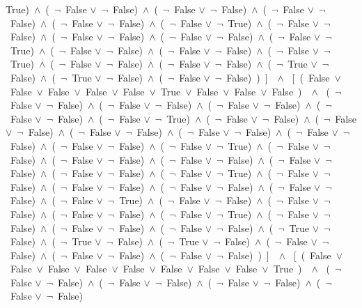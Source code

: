 ﻿\documentclass[a4paper,10pt]{article}
\begin{document}
True)\ $\wedge$\ (\  $\neg$\ False $\vee$\  $\neg$\ False)\ $\wedge$\ (\  $\neg$\ False $\vee$\  $\neg$\ False)\ $\wedge$\ (\  $\neg$\ False $\vee$\  $\neg$\ False)\ $\wedge$\ (\  $\neg$\ False $\vee$\  $\neg$\ False)\ $\wedge$\ (\  $\neg$\ False $\vee$\  $\neg$\ True)\ $\wedge$\ (\  $\neg$\ False $\vee$\  $\neg$\ False)\ $\wedge$\ (\  $\neg$\ False $\vee$\  $\neg$\ False)\ $\wedge$\ (\  $\neg$\ False $\vee$\  $\neg$\ False)\ $\wedge$\ (\  $\neg$\ False $\vee$\  $\neg$\ True)\ $\wedge$\ (\  $\neg$\ False $\vee$\  $\neg$\ False)\ $\wedge$\ (\  $\neg$\ False $\vee$\  $\neg$\ False)\ $\wedge$\ (\  $\neg$\ False $\vee$\  $\neg$\ True)\ $\wedge$\ (\  $\neg$\ False $\vee$\  $\neg$\ False)\ $\wedge$\ (\  $\neg$\ False $\vee$\  $\neg$\ False)\ $\wedge$\ (\  $\neg$\ True $\vee$\  $\neg$\ False)\ $\wedge$\ (\  $\neg$\ True $\vee$\  $\neg$\ False)\ $\wedge$\ (\  $\neg$\ False $\vee$\  $\neg$\ False)\ )\ ]\ \ $\wedge$ \ [\ (\ False\ $\vee$\ False\ $\vee$\ False\ $\vee$\ False\ $\vee$\ False\ $\vee$\ True\ $\vee$\ False\ $\vee$\ False\ $\vee$\ False\ )\ \ $\wedge$ \ (\  $\neg$\ False $\vee$\  $\neg$\ False)\ $\wedge$\ (\  $\neg$\ False $\vee$\  $\neg$\ False)\ $\wedge$\ (\  $\neg$\ False $\vee$\  $\neg$\ False)\ $\wedge$\ (\  $\neg$\ False $\vee$\  $\neg$\ False)\ $\wedge$\ (\  $\neg$\ False $\vee$\  $\neg$\ True)\ $\wedge$\ (\  $\neg$\ False $\vee$\  $\neg$\ False)\ $\wedge$\ (\  $\neg$\ False $\vee$\  $\neg$\ False)\ $\wedge$\ (\  $\neg$\ False $\vee$\  $\neg$\ False)\ $\wedge$\ (\  $\neg$\ False $\vee$\  $\neg$\ False)\ $\wedge$\ (\  $\neg$\ False $\vee$\  $\neg$\ False)\ $\wedge$\ (\  $\neg$\ False $\vee$\  $\neg$\ False)\ $\wedge$\ (\  $\neg$\ False $\vee$\  $\neg$\ True)\ $\wedge$\ (\  $\neg$\ False $\vee$\  $\neg$\ False)\ $\wedge$\ (\  $\neg$\ False $\vee$\  $\neg$\ False)\ $\wedge$\ (\  $\neg$\ False $\vee$\  $\neg$\ False)\ $\wedge$\ (\  $\neg$\ False $\vee$\  $\neg$\ False)\ $\wedge$\ (\  $\neg$\ False $\vee$\  $\neg$\ False)\ $\wedge$\ (\  $\neg$\ False $\vee$\  $\neg$\ True)\ $\wedge$\ (\  $\neg$\ False $\vee$\  $\neg$\ False)\ $\wedge$\ (\  $\neg$\ False $\vee$\  $\neg$\ False)\ $\wedge$\ (\  $\neg$\ False $\vee$\  $\neg$\ False)\ $\wedge$\ (\  $\neg$\ False $\vee$\  $\neg$\ False)\ $\wedge$\ (\  $\neg$\ False $\vee$\  $\neg$\ True)\ $\wedge$\ (\  $\neg$\ False $\vee$\  $\neg$\ False)\ $\wedge$\ (\  $\neg$\ False $\vee$\  $\neg$\ False)\ $\wedge$\ (\  $\neg$\ False $\vee$\  $\neg$\ False)\ $\wedge$\ (\  $\neg$\ False $\vee$\  $\neg$\ True)\ $\wedge$\ (\  $\neg$\ False $\vee$\  $\neg$\ False)\ $\wedge$\ (\  $\neg$\ False $\vee$\  $\neg$\ False)\ $\wedge$\ (\  $\neg$\ False $\vee$\  $\neg$\ False)\ $\wedge$\ (\  $\neg$\ True $\vee$\  $\neg$\ False)\ $\wedge$\ (\  $\neg$\ True $\vee$\  $\neg$\ False)\ $\wedge$\ (\  $\neg$\ True $\vee$\  $\neg$\ False)\ $\wedge$\ (\  $\neg$\ False $\vee$\  $\neg$\ False)\ $\wedge$\ (\  $\neg$\ False $\vee$\  $\neg$\ False)\ $\wedge$\ (\  $\neg$\ False $\vee$\  $\neg$\ False)\ )\ ]\ \ $\wedge$ \ [\ (\ False\ $\vee$\ False\ $\vee$\ False\ $\vee$\ False\ $\vee$\ False\ $\vee$\ False\ $\vee$\ False\ $\vee$\ False\ $\vee$\ True\ )\ \ $\wedge$ \ (\  $\neg$\ False $\vee$\  $\neg$\ False)\ $\wedge$\ (\  $\neg$\ False $\vee$\  $\neg$\ False)\ $\wedge$\ (\  $\neg$\ False $\vee$\  $\neg$\ False)\ $\wedge$\ (\  $\neg$\ False $\vee$\  $\neg$\ False)\ 
\end{document}
